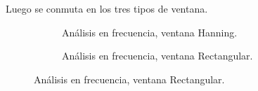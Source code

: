       Luego se conmuta en los tres tipos de ventana.

      \begin{figure}[H]
        \centering
        \begin{subfigure}[H]{0.48\textwidth}
          \caption{Análisis en frecuencia, ventana Hanning.}
        \end{subfigure}
        \hfill
        \begin{subfigure}[H]{0.48\textwidth}
          \caption{Análisis en frecuencia, ventana Rectangular.}

\end{subfigure}
\end{figure}
